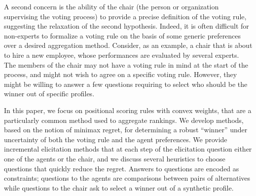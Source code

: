 \documentclass{article}
\begin{document}
A second concern is the ability of the chair (the person or organization supervising the voting process) to provide a precise definition of the voting rule, suggesting the relaxation of the second hypothesis. Indeed, it is often difficult for non-experts to formalize a voting rule on the basis of some generic preferences over a desired aggregation method. 
Consider, as an example, a chair that is about to hire a new employee, whose performances are evaluated by several experts. The members of the chair may not have a voting rule in mind at the start of the process, and might not wish to agree on a specific voting rule. However, they might be willing to answer a few questions requiring to select who should be the winner out of specific profiles. 

In this paper, we focus on positional scoring rules with convex weights, that are a particularly common method used to aggregate rankings. 
We develop methods, based on the notion of minimax regret, for determining a robust ``winner'' under uncertainty of both the voting rule and the agent preferences.
We provide incremental elicitation methods that 
at each step of the elicitation question either one of the agents or the chair, and we discuss several heuristics to choose questions that quickly reduce the regret. 
Answers to questions are encoded as constraints; questions to the agents are comparisons between pairs of alternatives while
questions to the chair ask to select a winner out of a synthetic profile.
\end{document}
